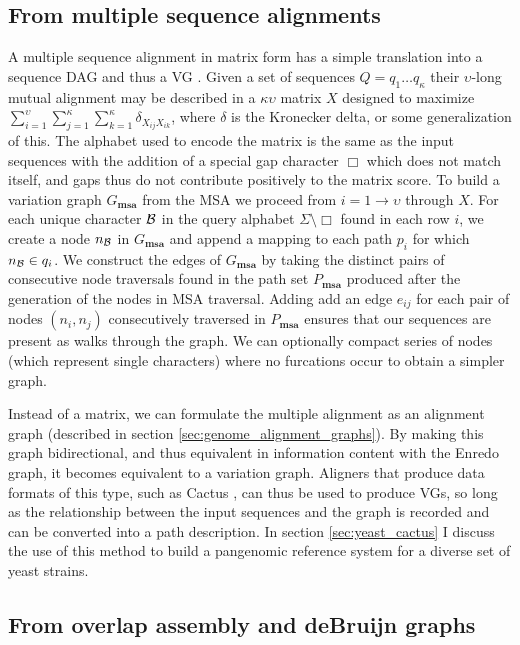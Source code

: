 \documentclass[a4paper,12pt,numbered,oneside]{Classes/PhDThesisPSnPDF}
\begin{document}
\subsection{From multiple sequence alignments}
A multiple sequence alignment in matrix form has a simple translation into a sequence DAG and thus a VG \cite{lee2002POA}.
Given a set of sequences $Q = q_1 \ldots q_\kappa$ their $\upsilon$-long mutual alignment may be described in a $\kappa \upsilon$ matrix $X$ designed to maximize $\sum_{i=1}^{\upsilon} \sum_{j=1}^{\kappa} \sum_{k=1}^{\kappa} \delta_{X_{ij}X_{ik}}$, where $\delta$ is the Kronecker delta, or some generalization of this.
The alphabet used to encode the matrix is the same as the input sequences with the addition of a special gap character $\Box$ which does not match itself, and gaps thus do not contribute positively to the matrix score.
To build a variation graph $G_\textbf{msa}$ from the MSA we proceed from $i = 1 \to \upsilon$ through $X$.
For each unique character ${\cal B}$ in the query alphabet $\Sigma \setminus \Box$ found in each row $i$, we create a node $n_{\cal B}$ in $G_\textbf{msa}$ and append a mapping to each path $p_i$ for which $n_{\cal B} \in q_i$.
We construct the edges of $G_\textbf{msa}$ by taking the distinct pairs of consecutive node traversals found in the path set $P_\textbf{msa}$ produced after the generation of the nodes in MSA traversal.
Adding add an edge $e_{ij}$ for each pair of nodes $(n_i, n_j)$ consecutively traversed in $P_\textbf{msa}$ ensures that our sequences are present as walks through the graph.
We can optionally compact series of nodes (which represent single characters) where no furcations occur to obtain a simpler graph.

Instead of a matrix, we can formulate the multiple alignment as an alignment graph (described in section \ref{sec:genome_alignment_graphs}).
By making this graph bidirectional, and thus equivalent in information content with the Enredo graph, it becomes equivalent to a variation graph.
Aligners that produce data formats of this type, such as Cactus \cite{Paten:2011fva}, can thus be used to produce VGs, so long as the relationship between the input sequences and the graph is recorded and can be converted into a path description.
In section \ref{sec:yeast_cactus} I discuss the use of this method to build a pangenomic reference system for a diverse set of yeast strains.

\subsection{From overlap assembly and deBruijn graphs}
\end{document}
